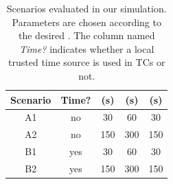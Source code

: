 \begin{table}
\renewcommand{\arraystretch}{1.2}
  \centering
  \begin{tabular}{ | c | c | c | c | c | }
    \hline
    Scenario        & Time? &  \paramtt{} (s)   & \paramteff{} (s)   & \paramtprl{} (s)  \\
    \hline
    \hline
    A1              & no                  & 30                & 60                 & 30                \\
    \hline
    A2              & no                  & 150               & 300                & 150               \\
    \hline
    B1              & yes                 & 30                & 60                 & 30                \\
    \hline
    B2              & yes                 & 150               & 300                & 150               \\
    \hline
  \end{tabular}
  \vspace{0.2cm}
  \caption[Scenarios evaluated in our simulation]{ Scenarios evaluated in our simulation. Parameters are chosen
  according to the desired \paramteff{}. The column named \emph{Time?} indicates
  whether a local trusted time source is used in \acsp{TC} or not.}
  \label{tbl:eval-scenarios}
\end{table}
%


